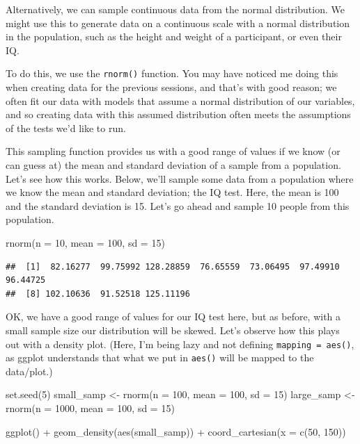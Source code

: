\documentclass[
]{book}
\newenvironment{Shaded}{\begin{snugshade}}{\end{snugshade}}
\newcommand{\AttributeTok}[1]{\textcolor[rgb]{0.77,0.63,0.00}{#1}}
\newcommand{\DecValTok}[1]{\textcolor[rgb]{0.00,0.00,0.81}{#1}}
\newcommand{\FunctionTok}[1]{\textcolor[rgb]{0.00,0.00,0.00}{#1}}
\newcommand{\NormalTok}[1]{#1}
\newcommand{\OtherTok}[1]{\textcolor[rgb]{0.56,0.35,0.01}{#1}}
\newcommand{\SpecialCharTok}[1]{\textcolor[rgb]{0.00,0.00,0.00}{#1}}
\begin{document}
Alternatively, we can sample continuous data from the normal distribution. We might use this to generate data on a continuous scale with a normal distribution in the population, such as the height and weight of a participant, or even their IQ.

To do this, we use the \texttt{rnorm()} function. You may have noticed me doing this when creating data for the previous sessions, and that's with good reason; we often fit our data with models that assume a normal distribution of our variables, and so creating data with this assumed distribution often meets the assumptions of the tests we'd like to run.

This sampling function provides us with a good range of values if we know (or can guess at) the mean and standard deviation of a sample from a population. Let's see how this works. Below, we'll sample some data from a population where we know the mean and standard deviation; the IQ test. Here, the mean is 100 and the standard deviation is 15. Let's go ahead and sample 10 people from this population.

\begin{Shaded}
\begin{Highlighting}[]
\FunctionTok{rnorm}\NormalTok{(}\AttributeTok{n =} \DecValTok{10}\NormalTok{, }\AttributeTok{mean =} \DecValTok{100}\NormalTok{, }\AttributeTok{sd =} \DecValTok{15}\NormalTok{)}
\end{Highlighting}
\end{Shaded}

\begin{verbatim}
##  [1]  82.16277  99.75992 128.28859  76.65559  73.06495  97.49910  96.44725
##  [8] 102.10636  91.52518 125.11196
\end{verbatim}

OK, we have a good range of values for our IQ test here, but as before, with a small sample size our distribution will be skewed. Let's observe how this plays out with a density plot. (Here, I'm being lazy and not defining \texttt{mapping\ =\ aes()}, as ggplot understands that what we put in \texttt{aes()} will be mapped to the data/plot.)

\begin{Shaded}
\begin{Highlighting}[]
\FunctionTok{set.seed}\NormalTok{(}\DecValTok{5}\NormalTok{)}
\NormalTok{small\_samp }\OtherTok{\textless{}{-}} \FunctionTok{rnorm}\NormalTok{(}\AttributeTok{n =} \DecValTok{100}\NormalTok{, }\AttributeTok{mean =} \DecValTok{100}\NormalTok{, }\AttributeTok{sd =} \DecValTok{15}\NormalTok{)}
\NormalTok{large\_samp }\OtherTok{\textless{}{-}} \FunctionTok{rnorm}\NormalTok{(}\AttributeTok{n =} \DecValTok{1000}\NormalTok{, }\AttributeTok{mean =} \DecValTok{100}\NormalTok{, }\AttributeTok{sd =} \DecValTok{15}\NormalTok{)}

\FunctionTok{ggplot}\NormalTok{() }\SpecialCharTok{+} \FunctionTok{geom\_density}\NormalTok{(}\FunctionTok{aes}\NormalTok{(small\_samp)) }\SpecialCharTok{+} \FunctionTok{coord\_cartesian}\NormalTok{(}\AttributeTok{x =} \FunctionTok{c}\NormalTok{(}\DecValTok{50}\NormalTok{, }\DecValTok{150}\NormalTok{))}
\end{Highlighting}
\end{Shaded}
\end{document}

